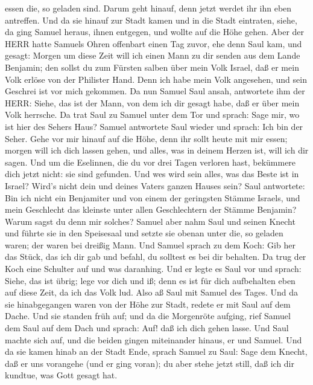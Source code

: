 essen die, so geladen sind. Darum geht hinauf, denn jetzt werdet ihr ihn
eben antreffen.  Und da sie hinauf zur Stadt kamen und in
die Stadt eintraten, siehe, da ging Samuel heraus, ihnen entgegen, und
wollte auf die Höhe gehen.  Aber der HERR hatte Samuels
Ohren offenbart einen Tag zuvor, ehe denn Saul kam, und gesagt:
 Morgen um diese Zeit will ich einen Mann zu dir senden aus
dem Lande Benjamin; den sollst du zum Fürsten salben über mein Volk
Israel, daß er mein Volk erlöse von der Philister Hand. Denn ich habe
mein Volk angesehen, und sein Geschrei ist vor mich gekommen.
 Da nun Samuel Saul ansah, antwortete ihm der HERR: Siehe,
das ist der Mann, von dem ich dir gesagt habe, daß er über mein Volk
herrsche.  Da trat Saul zu Samuel unter dem Tor und sprach:
Sage mir, wo ist hier des Sehers Haus?  Samuel antwortete
Saul wieder und sprach: Ich bin der Seher. Gehe vor mir hinauf auf die
Höhe, denn ihr sollt heute mit mir essen; morgen will ich dich lassen
gehen, und alles, was in deinem Herzen ist, will ich dir sagen.
 Und um die Eselinnen, die du vor drei Tagen verloren hast,
bekümmere dich jetzt nicht: sie sind gefunden. Und wes wird sein alles,
was das Beste ist in Israel? Wird's nicht dein und deines Vaters ganzen
Hauses sein?  Saul antwortete: Bin ich nicht ein Benjamiter
und von einem der geringsten Stämme Israels, und mein Geschlecht das
kleinste unter allen Geschlechtern der Stämme Benjamin? Warum sagst du
denn mir solches?  Samuel aber nahm Saul und seinen Knecht
und führte sie in den Speisesaal und setzte sie obenan unter die, so
geladen waren; der waren bei dreißig Mann.  Und Samuel
sprach zu dem Koch: Gib her das Stück, das ich dir gab und befahl, du
solltest es bei dir behalten.  Da trug der Koch eine
Schulter auf und was daranhing. Und er legte es Saul vor und sprach:
Siehe, das ist übrig; lege vor dich und iß; denn es ist für dich
aufbehalten eben auf diese Zeit, da ich das Volk lud. Also aß Saul mit
Samuel des Tages.  Und da sie hinabgegangen waren von der
Höhe zur Stadt, redete er mit Saul auf dem Dache.  Und sie
standen früh auf; und da die Morgenröte aufging, rief Samuel dem Saul
auf dem Dach und sprach: Auf! daß ich dich gehen lasse. Und Saul machte
sich auf, und die beiden gingen miteinander hinaus, er und Samuel.
 Und da sie kamen hinab an der Stadt Ende, sprach Samuel zu
Saul: Sage dem Knecht, daß er uns vorangehe (und er ging voran); du aber
stehe jetzt still, daß ich dir kundtue, was Gott gesagt hat.

